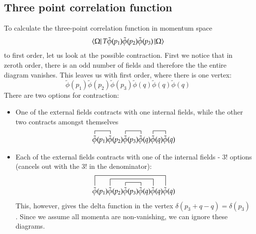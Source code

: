 \documentclass{article}
\begin{document}
\subsection{Three point correlation function}
To calculate the three-point correlation function in momentum space
\begin{equation}
    \bra{\Omega} T \tilde{\phi}(p_1)\tilde{\phi}(p_2)\tilde{\phi}(p_3) \ket{\Omega}
\end{equation}
to first order, let us look at the possible contraction. First we notice that in zeroth order, there is an odd number of fields and therefore the the entire diagram vanishes. This leaves us with first order, where there is one vertex:
\begin{equation}
    \tilde{\phi}(p_1)\tilde{\phi}(p_2)\tilde{\phi}(p_3)
    \tilde{\phi}(q)\tilde{\phi}(q)\tilde{\phi}(q)
\end{equation}
There are two options for contraction:
\begin{itemize}
    \item One of the external fields contracts with one internal fields, while the other two contracts amongst themselves
    \begin{equation}
        \contraction{}{\tilde{\phi}}{(p_1)}{\tilde{\phi}}
        \contraction{\tilde{\phi}(p_1)\tilde{\phi}(p_2)}{\tilde{\phi}}{(p_3)}{\tilde{\phi}}
        \contraction{\tilde{\phi}(p_1)\tilde{\phi}(p_2)\tilde{\phi}(p_3)\tilde{\phi}(q)}{\tilde{\phi}}{(q)}{\tilde{\phi}}
        \tilde{\phi}(p_1)\tilde{\phi}(p_2)\tilde{\phi}(p_3)
        \tilde{\phi}(q)\tilde{\phi}(q)\tilde{\phi}(q)
    \end{equation}
    \item Each of the external fields contracts with one of the internal fields - $3!$ options (cancels out with the $3!$ in the denominator):
    \begin{equation}
        \contraction[1.5em]{}{\tilde{\phi}}{(p_1)\tilde{\phi}(p_2)\tilde{\phi}(p_3)\tilde{\phi}(q)\tilde{\phi}(q)}{\tilde{\phi}}
        \contraction[1em]{\tilde{\phi}(p_1)}{\tilde{\phi}}{(p_2)\tilde{\phi}(p_3)\tilde{\phi}(q)}{\tilde{\phi}}
        \contraction[0.5em]{\tilde{\phi}(p_1)\tilde{\phi}(p_2)}{\tilde{\phi}}{(p_3)}{\tilde{\phi}}
        \tilde{\phi}(p_1)\tilde{\phi}(p_2)\tilde{\phi}(p_3)
        \tilde{\phi}(q)\tilde{\phi}(q)\tilde{\phi}(q)
    \end{equation}
    This, however, gives the delta function in the vertex $\delta(p_3 + q - q) = \delta(p_3)$. Since we assume all momenta are non-vanishing, we can ignore these diagrams.
\end{itemize}
\end{document}
